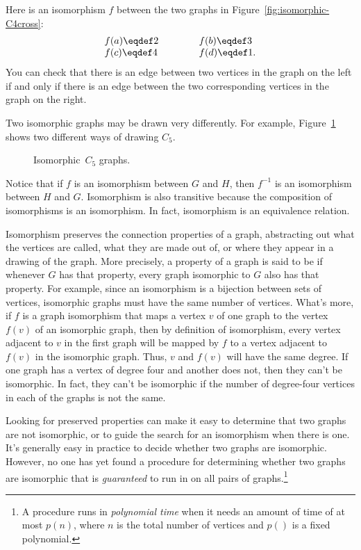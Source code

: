 Here is an isomorphism $f$ between the two graphs in
Figure~\ref{fig:isomorphic-C4cross}:
\[
\begin{array}{lll}
f(a) \eqdef 2 & \hspace{0.3in} & f(b) \eqdef 3 \\
f(c) \eqdef 4 & & f(d) \eqdef 1.
\end{array}
\]
You can check that there is an edge between two vertices in the graph
on the left if and only if there is an edge between the two
corresponding vertices in the graph on the right.

Two isomorphic graphs may be drawn very differently.  For example,
Figure~\ref{fig:isomorphic-C5s} shows two different ways of drawing
$C_5$.

\begin{figure}
\caption{Isomorphic~$C_5$ graphs.}
\label{fig:isomorphic-C5s}
\end{figure}

Notice that if $f$ is an isomorphism between $G$ and $H$, then
$f^{-1}$ is an isomorphism between $H$ and $G$.  Isomorphism is also
transitive because the composition of isomorphisms is an isomorphism.
In fact, isomorphism is an equivalence relation.

Isomorphism preserves the connection properties of a graph,
abstracting out what the vertices are called, what they are made out
of, or where they appear in a drawing of the graph.  More precisely, a
property of a graph is said to be 
if whenever $G$ has that property, every graph isomorphic to $G$ also
has that property.  For example, since an isomorphism is a bijection
between sets of vertices, isomorphic graphs must have the same number
of vertices.  What's more, if $f$ is a graph isomorphism that maps a
vertex $v$ of one graph to the vertex $f(v)$ of an isomorphic graph,
then by definition of isomorphism, every vertex adjacent to $v$ in the
first graph will be mapped by $f$ to a vertex adjacent to $f(v)$ in
the isomorphic graph.  Thus, $v$ and $f(v)$ will have the same degree.
If one graph has a vertex of degree four and another does not, then
they can't be isomorphic.  In fact, they can't be isomorphic if the
number of degree-four vertices in each of the graphs is not the same.

Looking for preserved properties can make it easy to determine that two
graphs are not isomorphic, or to guide the search for an
isomorphism when there is one.  It's generally easy in practice to decide
whether two graphs are isomorphic.  However, no one has yet found a
procedure for determining whether two graphs are isomorphic that is
\emph{guaranteed} to run in  on all pairs of
graphs.\footnote{A procedure runs in \emph{polynomial
    time} when it needs an amount of time of at most $p(n)$, where $n$ is
  the total number of vertices and $p()$ is a fixed polynomial.}

